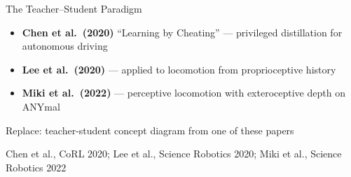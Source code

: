 \documentclass[aspectratio=169,10pt]{beamer}
\newcommand{\source}[1]{\vfill{\tiny\color{gray}#1\par}}
\newcommand{\placeholder}[2][0.7\textheight]{%
  \begin{center}
    \colorbox{gray!12}{%
      \parbox{0.85\linewidth}{\centering\vspace{#1}%
        {\small\color{gray!60}#2}%
        \vspace{#1}}%
    }%
  \end{center}
}
\begin{document}
\begin{frame}{The Teacher--Student Paradigm}

\begin{itemize}
  \item \textbf{Chen et al.\ (2020)} ``Learning by Cheating'' --- privileged
        distillation for autonomous driving
  \item \textbf{Lee et al.\ (2020)} --- applied to locomotion from
        proprioceptive history
  \item \textbf{Miki et al.\ (2022)} --- perceptive locomotion with
        exteroceptive depth on ANYmal
\end{itemize}

\vspace{8pt}

\placeholder[0.15\textheight]{Replace: teacher-student concept diagram
from one of these papers}

\source{Chen et al., CoRL 2020; Lee et al., Science Robotics 2020;
Miki et al., Science Robotics 2022}
\end{frame}
\end{document}
